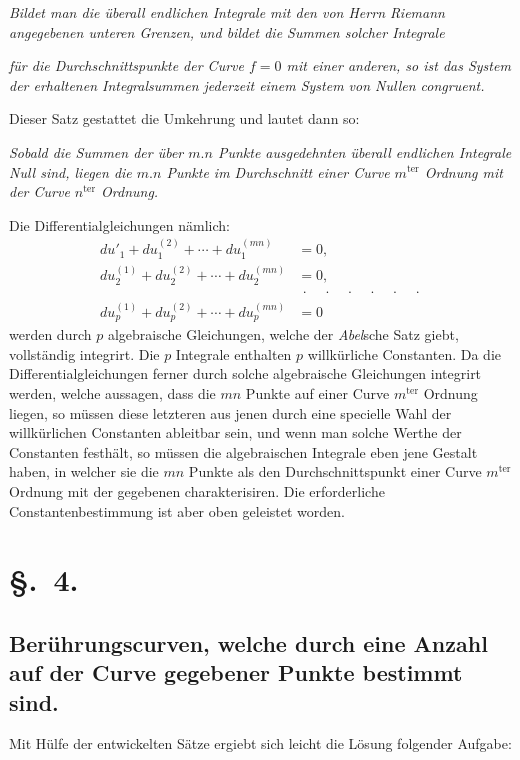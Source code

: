 \documentclass{article}
\begin{document}
\emph{Bildet man die überall endlichen Integrale mit den von Herrn Riemann angegebenen unteren Grenzen, und bildet die Summen solcher Integrale}

\emph{ für die Durchschnittspunkte der Curve $f = 0$ mit einer anderen, so ist das System der erhaltenen Integralsummen jederzeit einem System von Nullen congruent.}

Dieser Satz gestattet die Umkehrung und lautet dann so:

\emph{Sobald die Summen der über $m.n$ Punkte ausgedehnten überall endlichen Integrale Null sind, liegen die $m.n$ Punkte im Durchschnitt einer Curve $m^{\text{ter}}$ Ordnung mit der Curve $n^{\text{ter}}$ Ordnung.}

Die Differentialgleichungen nämlich:
\[
\begin{aligned}
du'_{1} + du_{1}^{(2)} + \cdots + du_{1}^{(mn)} &= 0, \\
du_{2}^{(1)} + du_{2}^{(2)} + \cdots + du_{2}^{(mn)} &= 0, \\
&\ \cdot\quad\cdot\quad\cdot\quad\cdot\quad\cdot\quad\cdot \\
du_{p}^{(1)} + du_{p}^{(2)} + \cdots + du_{p}^{(mn)} &= 0
\end{aligned}
\]
werden durch $p$ algebraische Gleichungen, welche der \emph{Abel}sche Satz giebt, vollständig integrirt. Die $p$ Integrale enthalten $p$ willkürliche Constanten. Da die Differentialgleichungen ferner durch solche algebraische Gleichungen integrirt werden, welche aussagen, dass die $mn$ Punkte auf einer Curve $m^{\text{ter}}$ Ordnung liegen, so müssen diese letzteren aus jenen durch eine specielle Wahl der willkürlichen Constanten ableitbar sein, und wenn man solche Werthe der Constanten festhält, so müssen die algebraischen Integrale eben jene Gestalt haben, in welcher sie die $mn$ Punkte als den Durchschnittspunkt einer Curve $m^{\text{ter}}$ Ordnung mit der gegebenen charakterisiren. Die erforderliche Constantenbestimmung ist aber oben geleistet worden.

\section*{§.~4.}
\subsection*{Berührungscurven, welche durch eine Anzahl auf der Curve gegebener Punkte bestimmt sind.}

Mit Hülfe der entwickelten Sätze ergiebt sich leicht die Lösung folgender Aufgabe:
\end{document}
